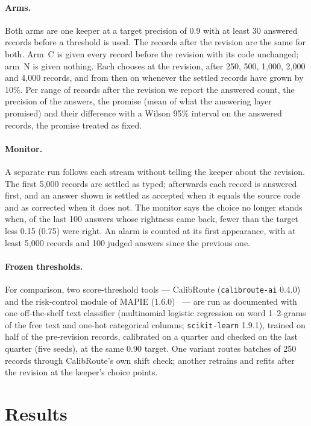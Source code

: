 \documentclass[11pt]{article}
\begin{document}
\paragraph{Arms.} Both arms are one keeper at a target precision of 0.9 with at least 30 answered records before a
threshold is used. The records after the revision are the same for both. Arm~C is given every record before the
revision with its code unchanged; arm~N is given nothing. Each chooses at the revision, after 250, 500, 1{,}000, 2{,}000
and 4{,}000 records, and from then on whenever the settled records have grown by 10\%. Per range of records after the
revision we report the answered count, the precision of the answers, the promise (mean of what the answering layer
promised) and their difference with a Wilson 95\% interval on the answered records, the promise treated as fixed.

\paragraph{Monitor.} A separate run follows each stream without telling the keeper about the revision. The first 5{,}000
records are settled as typed; afterwards each record is answered first, and an answer shown is settled as accepted when
it equals the source code and as corrected when it does not. The monitor says the choice no longer stands when, of the
last 100 answers whose rightness came back, fewer than the target less 0.15 (0.75) were right. An alarm is counted at
its first appearance, with at least 5{,}000 records and 100 judged answers since the previous one.

\paragraph{Frozen thresholds.} For comparison, two score-threshold tools --- CalibRoute (\texttt{calibroute-ai}
0.4.0)~\cite{calibroute} and the risk-control module of MAPIE (1.6.0)~\cite{mapie} --- are run as documented with one
off-the-shelf text classifier (multinomial logistic regression on word 1--2-grams of the free text and one-hot
categorical columns; \texttt{scikit-learn} 1.9.1), trained on half of the pre-revision records, calibrated on a quarter
and checked on the last quarter (five seeds), at the same 0.90 target. One variant routes batches of 250 records through
CalibRoute's own shift check; another retrains and refits after the revision at the keeper's choice points.

\section{Results}
\end{document}
